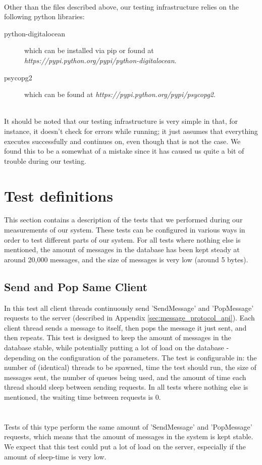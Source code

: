 \documentclass{article}
\begin{document}
        \\
        Other than the files described above, our testing infrastructure relies on the following python libraries: 
        \begin{description}
            \item[python-digitalocean] which can be installed via pip or found at \textit{https://pypi.python.org/pypi/python-digitalocean}.
            \item[psycopg2] which can be found at \textit{https://pypi.python.org/pypi/psycopg2}.
        \end{description}
        ~\\
        It should be noted that our testing infrastructure is very simple in that, for instance, it doesn't check for errors while running; it just assumes that everything executes successfully and continues on, even though that is not the case. We found this to be a somewhat of a mistake since it has caused us quite a bit of trouble during our testing.

    \section{Test definitions}
        \label{sec:test_definitions}
        This section contains a description of the tests that we performed during our measurements of our system. These tests can be configured in various ways in order to test different parts of our system. For all tests where nothing else is mentioned, the amount of messages in the database has been kept steady at around 20,000 messages, and the size of messages is very low (around 5 bytes).

        \subsection{Send and Pop Same Client}
            In this test all client threads continuously send 'SendMessage' and 'PopMessage' requests to the server (described in Appendix \ref{sec:message_protocol_api}). Each client thread sends a message to itself, then pops the message it just sent, and then repeats. This test is designed to keep the amount of messages in the database stable, while potentially putting a lot of load on the database - depending on the configuration of the parameters. The test is configurable in: the number of (identical) threads to be spawned, time the test should run, the size of messages sent, the number of queues being used, and the amount of time each thread should sleep between sending requests. In all tests where nothing else is mentioned, the waiting time between requests is 0.\\
            \\
            \\
            Tests of this type perform the same amount of 'SendMessage' and 'PopMessage' requests, which means that the amount of messages in the system is kept stable. We expect that this test could put a lot of load on the server, especially if the amount of sleep-time is very low.
\end{document}

